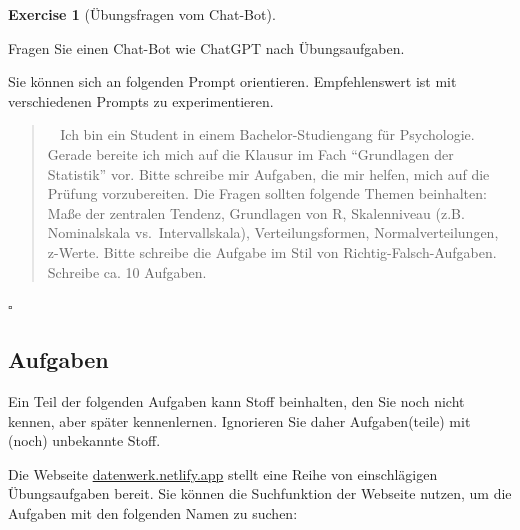 \documentclass[
  letterpaper,
  DIV=11,
  numbers=noendperiod]{scrartcl}
\theoremstyle{definition}
\theoremstyle{definition}
\newtheorem{exercise}{Exercise}[section]
\theoremstyle{definition}
\theoremstyle{remark}
\begin{document}
\begin{exercise}[Übungsfragen vom
Chat-Bot]\protect\hypertarget{exr-chatgpt}{}\label{exr-chatgpt}

Fragen Sie einen Chat-Bot wie ChatGPT nach Übungsaufgaben.

Sie können sich an folgenden Prompt orientieren. Empfehlenswert ist mit
verschiedenen Prompts zu experimentieren.

\begin{quote}
🧑‍🎓 Ich bin ein Student in einem Bachelor-Studiengang für Psychologie.
Gerade bereite ich mich auf die Klausur im Fach ``Grundlagen der
Statistik'' vor. Bitte schreibe mir Aufgaben, die mir helfen, mich auf
die Prüfung vorzubereiten. Die Fragen sollten folgende Themen
beinhalten: Maße der zentralen Tendenz, Grundlagen von R, Skalenniveau
(z.B. Nominalskala vs.~Intervallskala), Verteilungsformen,
Normalverteilungen, z-Werte. Bitte schreibe die Aufgabe im Stil von
Richtig-Falsch-Aufgaben. Schreibe ca. 10 Aufgaben.
\end{quote}

\(\square\)

\end{exercise}

\subsection{Aufgaben}\label{aufgaben}

Ein Teil der folgenden Aufgaben kann Stoff beinhalten, den Sie noch
nicht kennen, aber später kennenlernen. Ignorieren Sie daher
Aufgaben(teile) mit (noch) unbekannte Stoff.

Die Webseite \href{https://datenwerk.netlify.app}{datenwerk.netlify.app}
stellt eine Reihe von einschlägigen Übungsaufgaben bereit. Sie können
die Suchfunktion der Webseite nutzen, um die Aufgaben mit den folgenden
Namen zu suchen:
\end{document}

